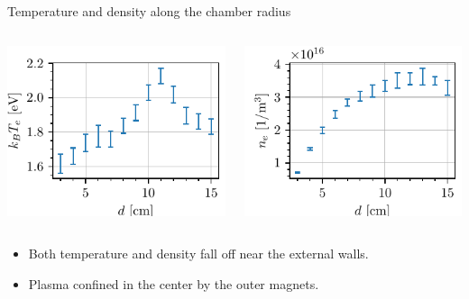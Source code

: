 \documentclass[10pt]{beamer}
\begin{document}


\begin{frame}{Temperature and density along the chamber radius}
    \begin{columns}
        \centering
        \includegraphics[scale=1]{../figures/temperatureeV_position_radial.pdf}

        \centering
        \includegraphics[scale=1]{../figures/density_position_radial.pdf}

    \end{columns}
    \vspace{0.5cm}
    \begin{itemize}
        \item Both temperature and density fall off near the external walls.
        \item Plasma confined in the center by the outer magnets.
    \end{itemize}
\end{frame}
\end{document}
